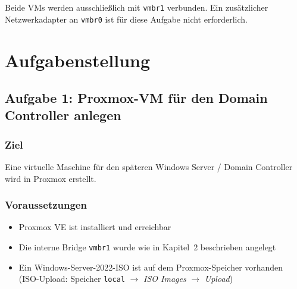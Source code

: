 \documentclass[11pt, oneside, numbers=noenddot]{scrbook}
\begin{document}
Beide VMs werden ausschließlich mit \texttt{vmbr1} verbunden. Ein zusätzlicher Netzwerkadapter an \texttt{vmbr0} ist für diese Aufgabe nicht erforderlich.



\chapter{Aufgabenstellung}

\section{Aufgabe 1: Proxmox-VM für den Domain Controller anlegen}

\subsection*{Ziel}
Eine virtuelle Maschine für den späteren Windows Server / Domain Controller wird in Proxmox erstellt.

\subsection*{Voraussetzungen}
\begin{itemize}
  \item Proxmox VE ist installiert und erreichbar
  \item Die interne Bridge \texttt{vmbr1} wurde wie in Kapitel~2 beschrieben angelegt
  \item Ein Windows-Server-2022-ISO ist auf dem Proxmox-Speicher vorhanden\\
        (ISO-Upload: Speicher \texttt{local} $\rightarrow$ \textit{ISO Images} $\rightarrow$ \textit{Upload})
\end{itemize}
\end{document}
